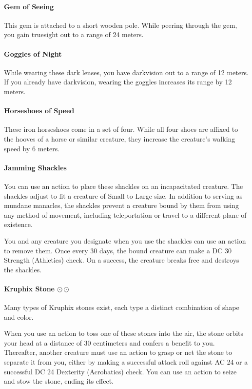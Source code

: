     \paragraph{Gem of Seeing}
        This gem is attached to a short wooden pole.
        While peering through the gem, you gain truesight out to a range of 24 meters.
    \paragraph{Goggles of Night}
        While wearing these dark lenses, you have darkvision out to a range of 12 meters.
        If you already have darkvision, wearing the goggles increases its range by 12 meters.
    \paragraph{Horseshoes of Speed}
        These iron horseshoes come in a set of four.
        While all four shoes are affixed to the hooves of a horse or similar creature, they increase the creature's walking speed by 6 meters.
    \paragraph{Jamming Shackles}
        You can use an action to place these shackles on an incapacitated creature.
        The shackles adjust to fit a creature of Small to Large size.
        In addition to serving as mundane manacles, the shackles prevent a creature bound by them from using any method of movement, including teleportation or travel to a different plane of existence.

        You and any creature you designate when you use the shackles can use an action to remove them.
        Once every 30 days, the bound creature can make a DC 30 Strength (Athletics) check.
        On a success, the creature breaks free and destroys the shackles.
    \paragraph{Kruphix Stone $\odot\odot$}
        Many types of Kruphix stones exist, each type a distinct combination of shape and color.

        When you use an action to toss one of these stones into the air, the stone orbits your head at a distance of 30 centimeters and confers a benefit to you.
        Thereafter, another creature must use an action to grasp or net the stone to separate it from you, either by making a successful attack roll against AC 24 or a successful DC 24 Dexterity (Acrobatics) check.
        You can use an action to seize and stow the stone, ending its effect.

